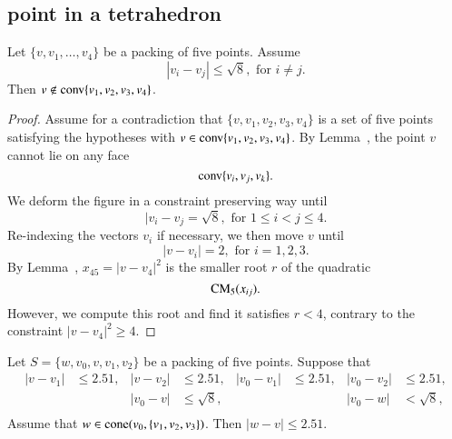 \begin{tarskidata}
\begin{tarski}
\subsection{point in a tetrahedron}

\begin{lemma} 
Let $\{v,v_1,\ldots,v_4\}$ be a packing of five points.  Assume
	$$ |v_i-v_j| \le \sqrt8, \text{ for } i\ne j.$$
Then $v\not\in {\operatorname{conv}}\{v_1,v_2,v_3,v_4\}$.
\end{lemma}


\begin{proof}  Assume for a contradiction that $\{v,v_1,v_2,v_3,v_4\}$ is a set
of five points satisfying the hypotheses with $v\in{\operatorname{conv}}\{v_1,v_2,v_3,v_4\}$.
By Lemma~, the point $v$ cannot lie on any face
	$${\operatorname{conv}}\{v_i,v_j,v_k\}.$$
We deform the figure in a constraint preserving way until 
	$$
	|v_i-v_j = \sqrt8,\text{ for } 1 \le i < j \le 4.
	$$
Re-indexing the vectors $v_i$ if necessary, we then move $v$ until
	$$
	|v-v_i| = 2, \text{ for } i=1,2,3.
	$$
By Lemma~, $x_{45}=|v-v_4|^2$ is the smaller root $r$ of the quadratic
	$${\operatorname{CM}}_5(x_{ij}).$$
However, we compute this root and find it satisfies $r < 4$, contrary to the
constraint $|v-v_4|^2 \ge 4$.
\end{proof}
\end{tarski}






\begin{tarski}

\begin{lemma}
Let $S=\{w,v_0,v,v_1,v_2\}$ be a packing of five points.
Suppose that
  $$\begin{array}{rlrlrlrl}
    |v-v_1|&\le 2.51, &
    |v-v_2|&\le 2.51, &
    |v_0-v_1|&\le 2.51,&
    |v_0-v_2|&\le 2.51,\\
    && |v_0-v|&\le \sqrt8,&
    &&|v_0-w|&< \sqrt8,\\
  \end{array}
  $$
Assume that $w\in{\operatorname{cone}}(v_0,\{v_1,v_2,v_3\})$.  %
Then $|w-v|\le 2.51$.
\end{lemma}


\end{tarski}
\end{tarskidata}
